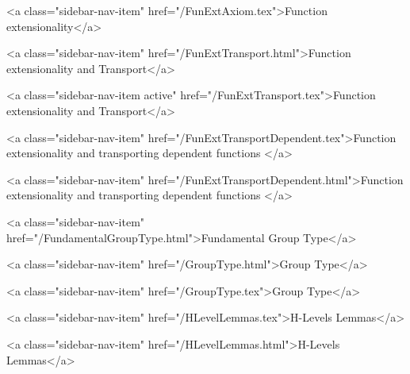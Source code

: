       
    
      
        
          <a class="sidebar-nav-item" href="/FunExtAxiom.tex">Function extensionality</a>
        
      
    
      
        
          <a class="sidebar-nav-item" href="/FunExtTransport.html">Function extensionality and Transport</a>
        
      
    
      
        
          <a class="sidebar-nav-item active" href="/FunExtTransport.tex">Function extensionality and Transport</a>
        
      
    
      
        
          <a class="sidebar-nav-item" href="/FunExtTransportDependent.tex">Function extensionality and transporting dependent functions </a>
        
      
    
      
        
          <a class="sidebar-nav-item" href="/FunExtTransportDependent.html">Function extensionality and transporting dependent functions </a>
        
      
    
      
        
          <a class="sidebar-nav-item" href="/FundamentalGroupType.html">Fundamental Group Type</a>
        
      
    
      
        
          <a class="sidebar-nav-item" href="/GroupType.html">Group Type</a>
        
      
    
      
        
          <a class="sidebar-nav-item" href="/GroupType.tex">Group Type</a>
        
      
    
      
        
          <a class="sidebar-nav-item" href="/HLevelLemmas.tex">H-Levels Lemmas</a>
        
      
    
      
        
          <a class="sidebar-nav-item" href="/HLevelLemmas.html">H-Levels Lemmas</a>
        
      
    
